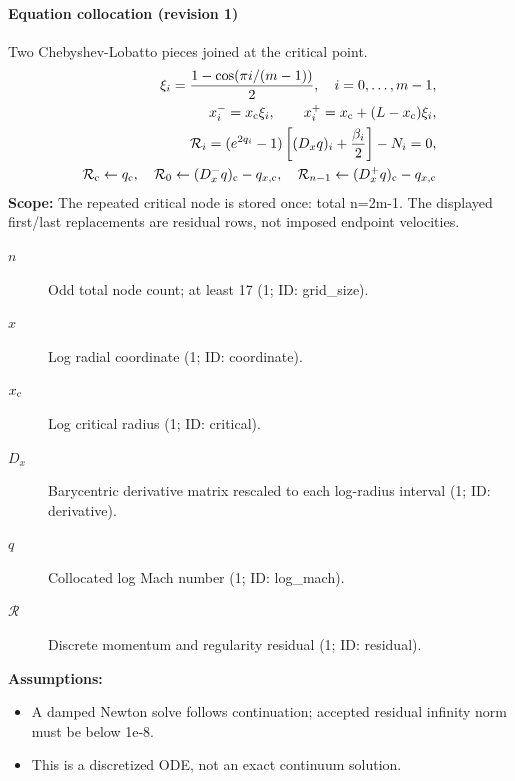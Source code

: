\paragraph{Equation collocation (revision 1)}
Two Chebyshev-Lobatto pieces joined at the critical point.
\begin{equation}
\begin{aligned}
\xi_i=\frac{1-\cos(\pi i/(m-1))}{2},\quad i=0,\ldots,m-1,\\
x_i^-=x_{\rm c}\xi_i,\qquad x_i^+=x_{\rm c}+(L-x_{\rm c})\xi_i,\\
\mathcal R_i=(e^{2q_i}-1)\left[(D_xq)_i+\frac{\beta_i}{2}\right]-N_i=0,\\
\mathcal R_{\rm c}\leftarrow q_{\rm c},\quad
\mathcal R_0\leftarrow(D_x^-q)_{\rm c}-q_{x,{\rm c}},\quad
\mathcal R_{n-1}\leftarrow(D_x^+q)_{\rm c}-q_{x,{\rm c}}
\end{aligned}
\label{eq:escape.parker_5f_wind:collocation:1}
\end{equation}
\noindent\textbf{Scope:} The repeated critical node is stored once: total n=2m-1. The displayed first/last replacements are residual rows, not imposed endpoint velocities.

\begin{description}
\item[$n$] Odd total node count; at least 17 (1; ID: grid\_size).
\item[$x$] Log radial coordinate (1; ID: coordinate).
\item[$x_{\rm c}$] Log critical radius (1; ID: critical).
\item[$D_x$] Barycentric derivative matrix rescaled to each log-radius interval (1; ID: derivative).
\item[$q$] Collocated log Mach number (1; ID: log\_mach).
\item[$\mathcal R$] Discrete momentum and regularity residual (1; ID: residual).
\end{description}

\noindent\textbf{Assumptions:}
\begin{itemize}
\item A damped Newton solve follows continuation; accepted residual infinity norm must be below 1e-8.
\item This is a discretized ODE, not an exact continuum solution.
\end{itemize}

